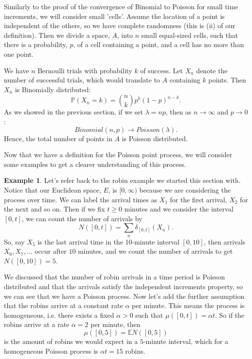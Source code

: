 \documentclass[11pt, oneside]{article}   	%
\theoremstyle{definition}
\newtheorem{example}{Example}[section]
\theoremstyle{remark}
\begin{document}
Similarly to the proof of the convergence of Binomial to Poisson for small time increments, we will consider small 'cells'. Assume the location of a point is independent of the others, so we have complete randomness (this is (ii) of our definition). Then we divide a space, $A$, into $n$ small equal-sized cells, such that there is a probability, $p$, of a cell containing a point, and a cell has no more than one point.

We have $n$ Bernoulli trials with probability $k$ of success. Let $X_n$ denote the number of successful trials, which would translate to $A$ containing $k$ points. Then $X_n$ is Binomially distributed:
$$\mathbb{P}(X_n=k)=\binom{n}{k} p^k(1-p)^{n-k}.$$
As we showed in the previous section, if we set $\lambda =np$, then as $n\to\infty$ and $p\to 0$:
$$\textit{Binomial}(n,p)\to \textit{Poisson}(\lambda).$$
Hence, the total number of points in $A$ is Poisson distributed.

\vspace{5mm}

Now that we have a definition for the Poisson point process, we will consider some examples to get a clearer understanding of this process.

\begin{example}
  Let's refer back to the robin example we started this section with. Notice that our Euclidean space, $E$, is $[0,\infty)$ because we are considering the process over time. We can label the arrival times as $X_1$ for the first arrival, $X_2$ for the next and so on. Then if we fix $t\geq0$ minutes and we consider the interval $[0,t]$, we can count the number of arrivals by $$N([0,t]) = \sum_{n}{\delta_{[0,t]}(X_n)}.$$ 
  So, say $X_5$ is the last arrival time in the 10-minute interval $[0, 10]$, then arrivals $X_6, X_7,...$ occur after $10$ minutes, and we count the number of arrivals to get $N([0,10])=5$.

  We discussed that the number of robin arrivals in a time period is Poisson distributed and that the arrivals satisfy the independent increments property, so we can see that we have a Poisson process. Now let's add the further assumption that the robins arrive at a constant rate $\alpha$ per minute. This means the process is homogeneous, i.e. there exists a fixed $\alpha>0$ such that $\mu([0,t]) = \alpha t$. So if the robins arrive at a rate $\alpha=2$ per minute, then 
  $$\mu([0,5])=\mathbb{E}N([0,5])$$ 
  is the amount of robins we would expect in a $5$-minute interval, which for a homogeneous Poisson process is $\alpha t=15$ robins.
\end{example}
\end{document}
